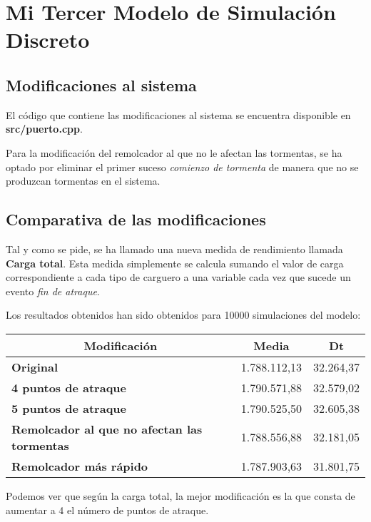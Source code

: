 \chapter{Mi Tercer Modelo de Simulación Discreto}

\section{Modificaciones al sistema}
El código que contiene las modificaciones al sistema se encuentra disponible en \textbf{src/puerto.cpp}.

Para la modificación del remolcador al que no le afectan las tormentas, se ha optado por eliminar el primer suceso \textit{comienzo de tormenta} de manera que no se produzcan tormentas en el sistema.

\section{Comparativa de las modificaciones}
Tal y como se pide, se ha llamado una nueva medida de rendimiento llamada \textbf{Carga total}. Esta medida simplemente se calcula sumando el valor de carga correspondiente a cada tipo de carguero a una variable cada vez que sucede un evento \textit{fin de atraque}.

Los resultados obtenidos han sido obtenidos para 10000 simulaciones del modelo:

\begin{table}[H]
\centering
\begin{tabular}{|l|c|c|}
\hline
\multicolumn{1}{|c|}{\textbf{Modificación}} & \textbf{Media} & \textbf{Dt} \\ \hline
\textbf{Original} & 1.788.112,13 & 32.264,37 \\ \hline
\textbf{4 puntos de atraque} & 1.790.571,88 & 32.579,02 \\ \hline
\textbf{5 puntos de atraque} & 1.790.525,50 & 32.605,38 \\ \hline
\textbf{Remolcador al que no afectan las tormentas} & 1.788.556,88 & 32.181,05 \\ \hline
\textbf{Remolcador más rápido} & 1.787.903,63 & 31.801,75 \\ \hline
\end{tabular}
\end{table}

Podemos ver que según la carga total, la mejor modificación es la que consta de aumentar a 4 el número de puntos de atraque.
